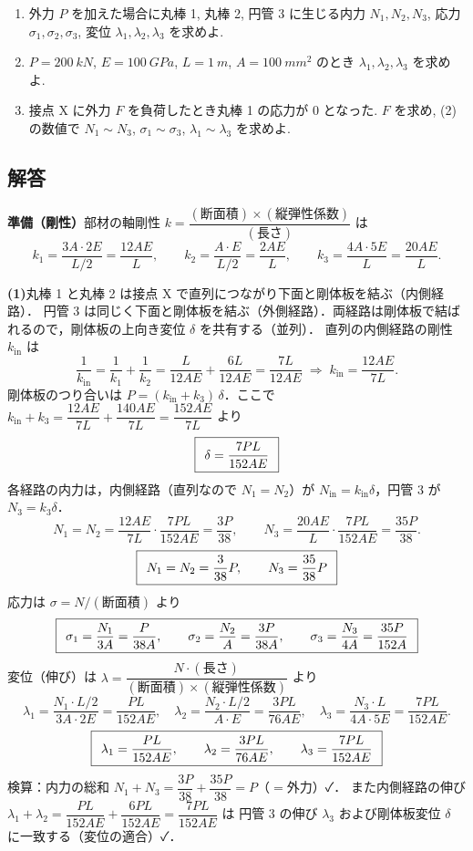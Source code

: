 \documentclass[11pt,a4paper]{article}
\begin{document}
\begin{enumerate}[label=(\arabic*)]
  \item 外力 $P$ を加えた場合に丸棒 1, 丸棒 2, 円管 3 に生じる内力 $N_1,N_2,N_3$,
        応力 $\sigma_1,\sigma_2,\sigma_3$, 変位 $\lambda_1,\lambda_2,\lambda_3$ を求めよ.
  \item $P=\SI{200}{kN}$, $E=\SI{100}{GPa}$, $L=\SI{1}{m}$, $A=\SI{100}{mm^2}$ のとき
        $\lambda_1,\lambda_2,\lambda_3$ を求めよ.
  \item 接点 X に外力 $F$ を負荷したとき丸棒 1 の応力が 0 となった. $F$ を求め,
        (2) の数値で $N_1\!\sim\!N_3$, $\sigma_1\!\sim\!\sigma_3$, $\lambda_1\!\sim\!\lambda_3$ を求めよ.
\end{enumerate}

\subsection*{解答}

\noindent\textbf{準備（剛性）}\quad 部材の軸剛性 $k=\dfrac{(\text{断面積})\times(\text{縦弾性係数})}{(\text{長さ})}$ は
\[
  k_1=\frac{3A\cdot 2E}{L/2}=\frac{12AE}{L},\qquad
  k_2=\frac{A\cdot E}{L/2}=\frac{2AE}{L},\qquad
  k_3=\frac{4A\cdot 5E}{L}=\frac{20AE}{L}.
\]

\medskip
\noindent\textbf{(1)}\quad 丸棒 1 と丸棒 2 は接点 X で直列につながり下面と剛体板を結ぶ（内側経路）．
円管 3 は同じく下面と剛体板を結ぶ（外側経路）．両経路は剛体板で結ばれるので，剛体板の上向き変位 $\delta$ を共有する（並列）．
直列の内側経路の剛性 $k_{\mathrm{in}}$ は
\[
  \frac{1}{k_{\mathrm{in}}}=\frac{1}{k_1}+\frac{1}{k_2}
  =\frac{L}{12AE}+\frac{6L}{12AE}=\frac{7L}{12AE}
  \;\Longrightarrow\; k_{\mathrm{in}}=\frac{12AE}{7L}.
\]
剛体板のつり合いは $P=(k_{\mathrm{in}}+k_3)\,\delta$．ここで
$k_{\mathrm{in}}+k_3=\dfrac{12AE}{7L}+\dfrac{140AE}{7L}=\dfrac{152AE}{7L}$ より
\[
  \boxed{\,\;\delta=\frac{7PL}{152AE}\;\,}
\]
各経路の内力は，内側経路（直列なので $N_1=N_2$）が $N_{\mathrm{in}}=k_{\mathrm{in}}\delta$，円管 3 が $N_3=k_3\delta$．
\[
  N_1=N_2=\frac{12AE}{7L}\cdot\frac{7PL}{152AE}=\frac{3P}{38},\qquad
  N_3=\frac{20AE}{L}\cdot\frac{7PL}{152AE}=\frac{35P}{38}.
\]
\[
  \boxed{\,\;N_1=N_2=\frac{3}{38}P,\qquad N_3=\frac{35}{38}P\;\,}
\]
応力は $\sigma=N/(\text{断面積})$ より
\[
  \boxed{\,\;\sigma_1=\frac{N_1}{3A}=\frac{P}{38A},\qquad
        \sigma_2=\frac{N_2}{A}=\frac{3P}{38A},\qquad
        \sigma_3=\frac{N_3}{4A}=\frac{35P}{152A}\;\,}
\]
変位（伸び）は $\lambda=\dfrac{N\cdot(\text{長さ})}{(\text{断面積})\times(\text{縦弾性係数})}$ より
\[
  \lambda_1=\frac{N_1\cdot L/2}{3A\cdot 2E}=\frac{PL}{152AE},\quad
  \lambda_2=\frac{N_2\cdot L/2}{A\cdot E}=\frac{3PL}{76AE},\quad
  \lambda_3=\frac{N_3\cdot L}{4A\cdot 5E}=\frac{7PL}{152AE}.
\]
\[
  \boxed{\,\;\lambda_1=\frac{PL}{152AE},\qquad \lambda_2=\frac{3PL}{76AE},\qquad \lambda_3=\frac{7PL}{152AE}\;\,}
\]
検算：内力の総和 $N_1+N_3=\dfrac{3P}{38}+\dfrac{35P}{38}=P$（$=$外力）✓．
また内側経路の伸び $\lambda_1+\lambda_2=\dfrac{PL}{152AE}+\dfrac{6PL}{152AE}=\dfrac{7PL}{152AE}$ は
円管 3 の伸び $\lambda_3$ および剛体板変位 $\delta$ に一致する（変位の適合）✓．
\end{document}
